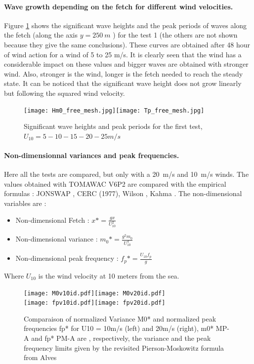 \paragraph{Wave growth depending on the fetch for different wind velocities.}
Figure \ref{hsfet} shows the significant wave heights and the peak periods of waves along the fetch (along the axis $ y = 250~m$ ) for the test 1 (the others are not shown because they give the same conclusions). These curves are obtained after 48 hour of wind action for a wind of 5 to 25 m/s. It is clearly seen that the wind has a considerable impact on these values and bigger waves are obtained with stronger wind. Also, stronger is the wind, longer is the fetch needed to reach the steady state. It can be noticed that the significant wave height does not grow linearly but following the squared wind velocity.
\begin{figure}[H]
  \centering
  	\texttt{[image: Hm0\_free\_mesh.jpg]}\texttt{[image: Tp\_free\_mesh.jpg]}
      \caption{Significant wave heights and peak periods for the first test, $U_{10} = 5 - 10 - 15 - 20 - 25 m/s$}
\label{hsfet}
\end{figure}
\paragraph{Non-dimensionnal variances and peak frequencies.}
Here all the tests are compared, but only with a 20~m/s and 10~m/s winds. The values obtained with TOMAWAC V6P2 are compared with the empirical formulas : JONSWAP \cite{Hasselmann1973}, CERC (1977)\cite {CERC77}, Wilson \cite{Wilson1965}, Kahma \cite{Kahma1992}. The non-dimensional variables are :\\
\begin{itemize}
\item Non-dimensional Fetch : $x* = \frac{g x}{U_{10}^2}$
\item Non-dimensional variance : $m_{0}* = \frac{g^2 m_{0}}{U_{10}^4}$
\item Non-dimensional peak frequency : $f_{p}* = \frac{U_{10} f_{p}}{g}$
\end{itemize}
Where $U_{10}$ is the wind velocity at 10 meters from the sea.\\
\begin{figure}[H]
  \centering
  	\texttt{[image: M0v10id.pdf]}\texttt{[image: M0v20id.pdf]}\\
  	\texttt{[image: fpv10id.pdf]}\texttt{[image: fpv20id.pdf]}\\
      \caption{Comparaison of normalized Variance M0* and normalized peak frequencies fp* for U10 = 10m/s (left) and 20m/s (right), m0* MP-A and fp* PM-A are , respectively, the variance and the peak frequency limits given by the revisited Pierson-Moskowitz formula from Alves \cite{Alves2003}}
\label{variancefet}
\end{figure}

